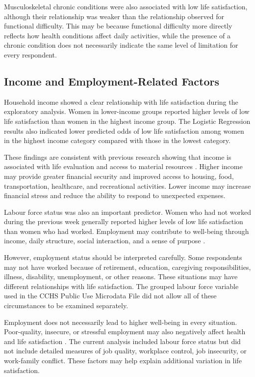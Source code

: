 \documentclass[12pt]{article}
\begin{document}
Musculoskeletal chronic conditions were also associated with low life satisfaction, although their relationship was weaker than the relationship observed for functional difficulty. This may be because functional difficulty more directly reflects how health conditions affect daily activities, while the presence of a chronic condition does not necessarily indicate the same level of limitation for every respondent.

\subsection{Income and Employment-Related Factors}

Household income showed a clear relationship with life satisfaction during the exploratory analysis. Women in lower-income groups reported higher levels of low life satisfaction than women in the highest income group. The Logistic Regression results also indicated lower predicted odds of low life satisfaction among women in the highest income category compared with those in the lowest category.

These findings are consistent with previous research showing that income is associated with life evaluation and access to material resources \citep{kahneman2010}. Higher income may provide greater financial security and improved access to housing, food, transportation, healthcare, and recreational activities. Lower income may increase financial stress and reduce the ability to respond to unexpected expenses.

Labour force status was also an important predictor. Women who had not worked during the previous week generally reported higher levels of low life satisfaction than women who had worked. Employment may contribute to well-being through income, daily structure, social interaction, and a sense of purpose \citep{clark1994}.

However, employment status should be interpreted carefully. Some respondents may not have worked because of retirement, education, caregiving responsibilities, illness, disability, unemployment, or other reasons. These situations may have different relationships with life satisfaction. The grouped labour force variable used in the CCHS Public Use Microdata File did not allow all of these circumstances to be examined separately.

Employment does not necessarily lead to higher well-being in every situation. Poor-quality, insecure, or stressful employment may also negatively affect health and life satisfaction \citep{butterworth2011}. The current analysis included labour force status but did not include detailed measures of job quality, workplace control, job insecurity, or work-family conflict. These factors may help explain additional variation in life satisfaction.
\end{document}
